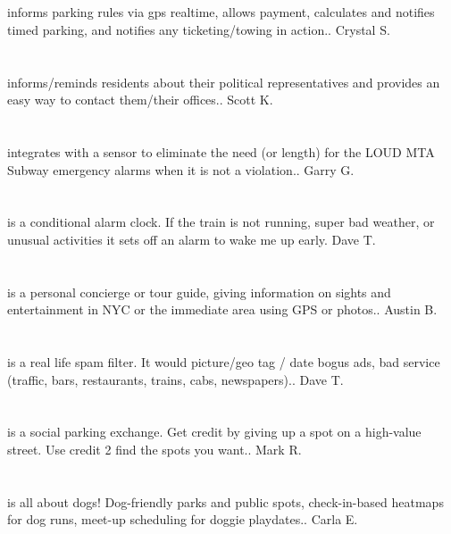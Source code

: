 \section{}informs parking rules via gps realtime,  allows payment,  calculates and notifies timed parking,  and notifies any ticketing/towing in action.. Crystal  S.
\section{}informs/reminds residents about their political representatives and provides an easy way to contact them/their offices.. Scott K.
\section{}integrates with a sensor to eliminate the need (or length) for the LOUD MTA Subway emergency alarms when it is not a violation.. Garry G.
\section{}is a conditional alarm clock. If the train is not running,  super bad weather,  or unusual activities it sets off an alarm to wake me up early. Dave T.
\section{}is a personal concierge or tour guide,  giving information on sights and entertainment in NYC or the immediate area using GPS or photos.. Austin B.
\section{}is a real life spam filter. It would picture/geo tag / date bogus ads,  bad service (traffic, bars, restaurants, trains, cabs, newspapers).. Dave T.
\section{}is a social parking exchange.  Get credit by giving up a spot on a high-value street.  Use credit 2 find the spots you want.. Mark R.
\section{}is all about dogs! Dog-friendly parks and public spots,  check-in-based heatmaps for dog runs,  meet-up scheduling for doggie playdates.. Carla E.
